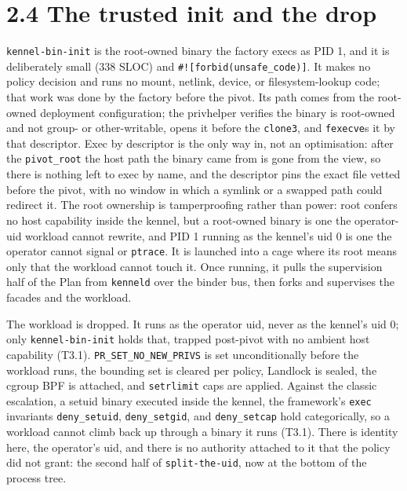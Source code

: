 \hypertarget{the-trusted-init-and-the-drop}{%
\section{2.4 The trusted init and the
drop}\label{the-trusted-init-and-the-drop}}

\texttt{kennel-bin-init} is the root-owned binary the factory execs as
PID 1, and it is deliberately small (338 SLOC) and
\texttt{\#!{[}forbid(unsafe\_code){]}}. It makes no policy decision and
runs no mount, netlink, device, or filesystem-lookup code; that work was
done by the factory before the pivot. Its path comes from the root-owned
deployment configuration; the privhelper verifies the binary is
root-owned and not group- or other-writable, opens it before the
\texttt{clone3}, and \texttt{fexecve}s it by that descriptor. Exec by
descriptor is the only way in, not an optimisation: after the
\texttt{pivot\_root} the host path the binary came from is gone from the
view, so there is nothing left to exec by name, and the descriptor pins
the exact file vetted before the pivot, with no window in which a
symlink or a swapped path could redirect it. The root ownership is
tamperproofing rather than power: root confers no host capability inside
the kennel, but a root-owned binary is one the operator-uid workload
cannot rewrite, and PID 1 running as the kennel's uid 0 is one the
operator cannot signal or \texttt{ptrace}. It is launched into a cage
where its root means only that the workload cannot touch it. Once
running, it pulls the supervision half of the Plan from \texttt{kenneld}
over the binder bus, then forks and supervises the facades and the
workload.

The workload is dropped. It runs as the operator uid, never as the
kennel's uid 0; only \texttt{kennel-bin-init} holds that, trapped
post-pivot with no ambient host capability (T3.1).
\texttt{PR\_SET\_NO\_NEW\_PRIVS} is set unconditionally before the
workload runs, the bounding set is cleared per policy, Landlock is
sealed, the cgroup BPF is attached, and \texttt{setrlimit} caps are
applied. Against the classic escalation, a setuid binary executed inside
the kennel, the framework's \texttt{exec} invariants
\texttt{deny\_setuid}, \texttt{deny\_setgid}, and \texttt{deny\_setcap}
hold categorically, so a workload cannot climb back up through a binary
it runs (T3.1). There is identity here, the operator's uid, and there is
no authority attached to it that the policy did not grant: the second
half of \texttt{split-the-uid}, now at the bottom of the process tree.

